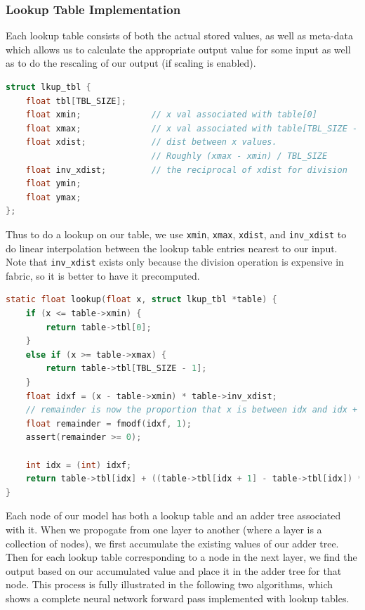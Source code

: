 \documentclass{article}
\begin{document}
\subsubsection{Lookup Table Implementation}
Each lookup table consists of both the actual stored values, as well as meta-data which allows us to calculate the appropriate output value for some input as well as to do the rescaling of our output (if scaling is enabled).

\begin{lstlisting}[language=C]
struct lkup_tbl {
    float tbl[TBL_SIZE];
    float xmin;              // x val associated with table[0]
    float xmax;              // x val associated with table[TBL_SIZE - 1]
    float xdist;             // dist between x values.
                             // Roughly (xmax - xmin) / TBL_SIZE
    float inv_xdist;         // the reciprocal of xdist for division
    float ymin;
    float ymax;
};
\end{lstlisting}

Thus to do a lookup on our table, we use \texttt{xmin}, \texttt{xmax}, \texttt{xdist}, and \texttt{inv\_xdist} to do linear interpolation between the lookup table entries nearest to our input. Note that \texttt{inv\_xdist} exists only because the division operation is expensive in fabric, so it is better to have it precomputed.

\begin{lstlisting}[language=C]
static float lookup(float x, struct lkup_tbl *table) {
    if (x <= table->xmin) {
        return table->tbl[0];
    }
    else if (x >= table->xmax) {
        return table->tbl[TBL_SIZE - 1];
    }
    float idxf = (x - table->xmin) * table->inv_xdist;
    // remainder is now the proportion that x is between idx and idx + 1
    float remainder = fmodf(idxf, 1);
    assert(remainder >= 0);

    int idx = (int) idxf;
    return table->tbl[idx] + ((table->tbl[idx + 1] - table->tbl[idx]) * remainder);
}
\end{lstlisting}

Each node of our model has both a lookup table and an adder tree associated with it. When we propogate from one layer to another (where a layer is a collection of nodes), we first accumulate the existing values of our adder tree. Then for each lookup table corresponding to a node in the next layer, we find the output based on our accumulated value and place it in the adder tree for that node. This process is fully illustrated in the following two algorithms, which shows a complete neural network forward pass implemented with lookup tables.
\end{document}
